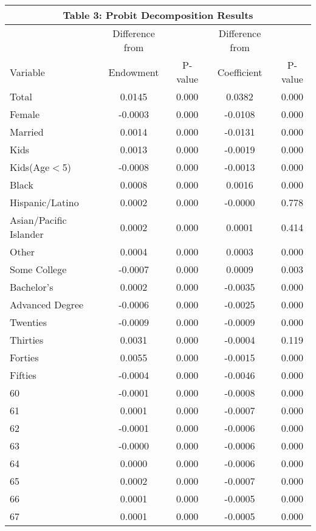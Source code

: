 \documentclass[11pt]{article}
\theoremstyle{definition}
\begin{document}
\vspace{2.5mm}
\noindent
\begin{center}
\begin{tabular}{l c c c c}
\hline\hline
\multicolumn{5}{c}{\textbf{Table 3: Probit Decomposition Results}} \\
\hline
 & Difference from  &  &  Difference from &  \\
Variable & Endowment & P-value &  Coefficient & P-value \\
\hline
Total & 0.0145 & 0.000 & 0.0382 & 0.000 \\
 Female & -0.0003 & 0.000 & -0.0108 & 0.000 \\
 Married & 0.0014 & 0.000 & -0.0131 & 0.000 \\
 Kids  & 0.0013 & 0.000 & -0.0019 & 0.000 \\
 Kids(Age$<$5)  & -0.0008 & 0.000 & -0.0013 & 0.000 \\
 Black & 0.0008 & 0.000 & 0.0016 & 0.000 \\
 Hispanic/Latino  & 0.0002 & 0.000 & -0.0000 & 0.778 \\
 Asian/Pacific Islander  & 0.0002 & 0.000 & 0.0001 & 0.414 \\
 Other & 0.0004 & 0.000 & 0.0003 & 0.000 \\
 Some College  & -0.0007 & 0.000 & 0.0009 & 0.003 \\
 Bachelor's  & 0.0002 & 0.000 & -0.0035 & 0.000 \\
 Advanced Degree  & -0.0006 & 0.000 & -0.0025 & 0.000 \\
 Twenties  & -0.0009 & 0.000 & -0.0009 & 0.000 \\
 Thirties  & 0.0031 & 0.000 & -0.0004 & 0.119 \\
 Forties  & 0.0055 & 0.000 & -0.0015 & 0.000 \\
 Fifties  & -0.0004 & 0.000 & -0.0046 & 0.000 \\
 60  & -0.0001 & 0.000 & -0.0008 & 0.000 \\
 61  & 0.0001 & 0.000 & -0.0007 & 0.000 \\
 62 & -0.0001 & 0.000 & -0.0006 & 0.000 \\
 63  & -0.0000 & 0.000 & -0.0006 & 0.000 \\
 64  & 0.0000 & 0.000 & -0.0006 & 0.000 \\
 65 & 0.0002 & 0.000 & -0.0007 & 0.000 \\
 66  & 0.0001 & 0.000 & -0.0005 & 0.000 \\
 67  & 0.0001 & 0.000 & -0.0005 & 0.000 \\

\end{tabular}
\end{center}
\end{document}
